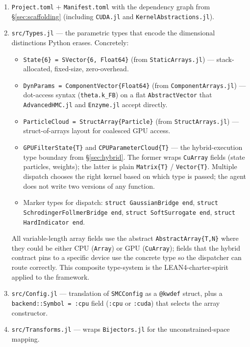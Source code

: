 \documentclass[11pt,a4paper]{article}
\begin{document}
\begin{enumerate}
\item \texttt{Project.toml} + \texttt{Manifest.toml} with the
  dependency graph from §\ref{sec:scaffolding} (including
  \texttt{CUDA.jl} and \texttt{KernelAbstractions.jl}).
\item \texttt{src/Types.jl} --- the parametric types that encode
  the dimensional distinctions Python erases. Concretely:
  \begin{itemize}
  \item \texttt{State\{6\} = SVector\{6, Float64\}} (from
    \texttt{StaticArrays.jl}) --- stack-allocated, fixed-size,
    zero-overhead.
  \item \texttt{DynParams = ComponentVector\{Float64\}} (from
    \texttt{ComponentArrays.jl}) --- dot-access syntax
    (\texttt{theta.k\_FB}) on a flat \texttt{AbstractVector} that
    \texttt{AdvancedHMC.jl} and \texttt{Enzyme.jl} accept directly.
  \item \texttt{ParticleCloud = StructArray\{Particle\}} (from
    \texttt{StructArrays.jl}) --- struct-of-arrays layout for
    coalesced GPU access.
  \item \texttt{GPUFilterState\{T\}} and \texttt{CPUParameterCloud\{T\}}
    --- the hybrid-execution type boundary from
    §\ref{sec:hybrid}. The former wraps \texttt{CuArray} fields
    (state particles, weights); the latter is plain
    \texttt{Matrix\{T\}} / \texttt{Vector\{T\}}. Multiple
    dispatch chooses the right kernel based on which type is
    passed; the agent does not write two versions of any
    function.
  \item Marker types for dispatch: \texttt{struct GaussianBridge
    end}, \texttt{struct SchrodingerFollmerBridge end},
    \texttt{struct SoftSurrogate end}, \texttt{struct
    HardIndicator end}.
  \end{itemize}
  All variable-length array fields use the abstract
  \texttt{AbstractArray\{T,N\}} where they could be either CPU
  (\texttt{Array}) or GPU (\texttt{CuArray}); fields that the
  hybrid contract pins to a specific device use the concrete
  type so the dispatcher can route correctly. This composite
  type-system is the LEAN4-charter-spirit applied to the
  framework.
\item \texttt{src/Config.jl} --- translation of
   \texttt{SMCConfig} as a \texttt{@kwdef}
  struct, plus a \texttt{backend::Symbol = :cpu} field
  (\texttt{:cpu} or \texttt{:cuda}) that selects the array
  constructor.
\item \texttt{src/Transforms.jl} --- wraps \texttt{Bijectors.jl}
  for the unconstrained-space mapping.
\end{enumerate}
\end{document}

